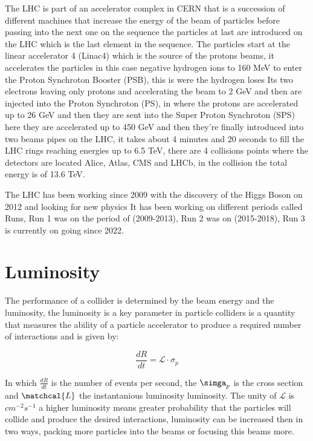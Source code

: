 The LHC is part of an accelerator complex in CERN that is a succession of different machines that increase the energy of the beam of particles before passing into the next one on the sequence the particles at last are introduced on the LHC which is the last element in the sequence. The particles start at the linear accelerator 4 (Linac4) which is the source of the protons beams, it accelerates the particles in this case negative hydrogen ions to 160 MeV to enter the Proton Synchroton Booster (PSB), this is were the hydrogen loses Its two electrons leaving only protons and accelerating the beam to 2 GeV  and then are injected into the Proton Synchroton (PS), in where the protons are accelerated up to 26 GeV and then they are sent into the Super Proton Synchroton (SPS) here they are accelerated up to 450 GeV and then they're finally introduced into two beams pipes on the LHC, it takes about 4 minutes and 20 seconds to fill the LHC rings reaching energies up to 6.5 TeV, there are 4 collisions points where the detectors are located Alice, Atlas, CMS and LHCb, in the collision the total energy is of 13.6 TeV. \cite{LHCII}

The LHC has been working since 2009 with the discovery of the Higgs Boson on 2012 and looking for new physics It has been working on different periods called Runs, Run 1 was on the period of (2009-2013), Run 2 was on (2015-2018), Run 3 is currently on going since 2022. 



\section{Luminosity}

The performance of a collider is determined by the beam energy and the luminosity, the luminosity is a key parameter in particle colliders is a quantity that measures the ability of a particle accelerator to produce a required number of interactions and is given by: \cite{Lum} 

\begin{equation}
\frac{dR}{dt} = \mathcal{L} \cdot \sigma_{p} 
\end{equation}

In which $\frac{dR}{dt}$ is the number of events per second, the $\simga_{p}$ is the cross section and $\matchcal{L}$ the instantanious luminosity luminosity. The unity of $\mathcal{L}$ is  $cm^{-2} s^{-1}$ a higher luminosity means greater probability that the particles will collide and produce the desired interactions, luminosity can be increased then in two ways, packing more particles into the beams or focusing this beams more.  

